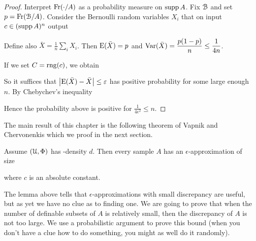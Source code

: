 \documentclass[sputnik.tex]{subfiles}
\begin{document}
\begin{proof}
Interpret $\Fr(\cdot/A)$ as a probability measure on $\supp A$. Fix $\B$ and set $p=\Fr(\B/A)$. Consider the Bernoulli random variables $X_i$ that on input $c\in(\supp A)^n$ output


Define also $\displaystyle\bar X=\frac1n\sum_iX_i$. Then ${\rm E}(\bar X)=p$ and $\displaystyle{\rm Var}(\bar X)=\frac{p(1-p)}{n}\le\frac1{4n}$. 

If we set $C=\range(c)$, we obtain 


So it suffices that $\big|{\rm E}(\bar X) - \bar X\big|\le\epsilon$ has positive probability for some large enough $n$. By Chebychev's inequality


% 

Hence the probability above is positive for $\displaystyle\frac1{4\epsilon^{\scriptscriptstyle 2}}\le n$.
\end{proof}

The main result of this chapter is the following theorem of  Vapnik and Chervonenkis which we proof in the next section.

\begin{theorem}\label{thm_epsilon_approx}
Assume $(\U,\Phi)$ has \vc-density $d$. Then every sample $A$ has an $\epsilon$-approximation of size 


where $c$ is an absolute constant.
\end{theorem}



The lemma above tells that $\epsilon$-approximations with small discrepancy are useful, but as yet we have no clue as to finding one.
We are going to prove that when the number of definable subsets of $A$ is relatively small, then the discrepancy of $A$ is not too large.
We use a probabilistic argument to prove this bound (when you don't have a clue how to do something, you might as well do it randomly).
\end{document}

